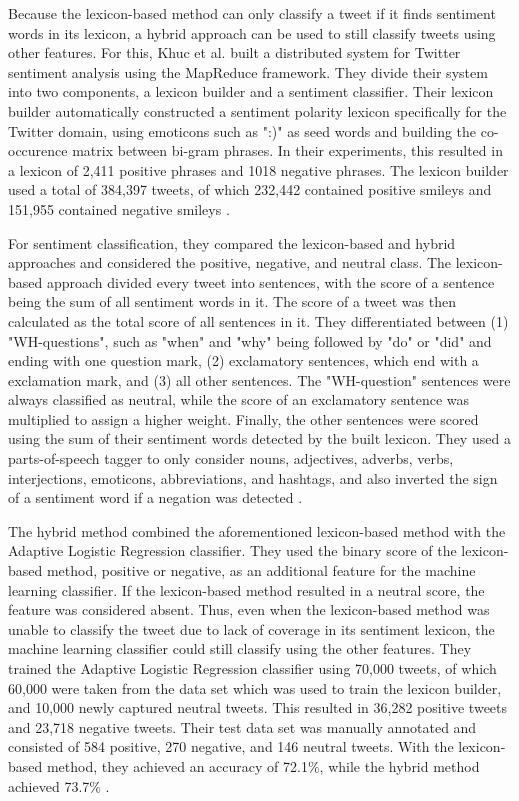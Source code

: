 Because the lexicon-based method can only classify a tweet if it finds sentiment words in its lexicon, a hybrid approach can be used to still classify tweets using other features. For this, Khuc et al. built a distributed system for Twitter sentiment analysis using the MapReduce framework. They divide their system into two components, a lexicon builder and a sentiment classifier. Their lexicon builder automatically constructed a sentiment polarity lexicon specifically for the Twitter domain, using emoticons such as ":)" as seed words and building the co-occurence matrix between bi-gram phrases. In their experiments, this resulted in a lexicon of 2,411 positive phrases and 1018 negative phrases. The lexicon builder used a total of 384,397 tweets, of which 232,442 contained positive smileys and 151,955 contained negative smileys \cite{khuc}.

For sentiment classification, they compared the lexicon-based and hybrid approaches and considered the positive, negative, and neutral class. The lexicon-based approach divided every tweet into sentences, with the score of a sentence being the sum of all sentiment words in it. The score of a tweet was then calculated as the total score of all sentences in it. They differentiated between (1) "WH-questions", such as "when" and "why" being followed by "do" or "did" and ending with one question mark, (2) exclamatory sentences, which end with a exclamation mark, and (3) all other sentences. The "WH-question" sentences were always classified as neutral, while the score of an exclamatory sentence was multiplied to assign a higher weight. Finally, the other sentences were scored using the sum of their sentiment words detected by the built lexicon. They used a parts-of-speech tagger to only consider nouns, adjectives, adverbs, verbs, interjections, emoticons, abbreviations, and hashtags, and also inverted the sign of a sentiment word if a negation was detected \cite{khuc}.

The hybrid method combined the aforementioned lexicon-based method with the Adaptive Logistic Regression classifier. They used the binary score of the lexicon-based method, positive or negative, as an additional feature for the machine learning classifier. If the lexicon-based method resulted in a neutral score, the feature was considered absent. Thus, even when the lexicon-based method was unable to classify the tweet due to lack of coverage in its sentiment lexicon, the machine learning classifier could still classify using the other features. They trained the Adaptive Logistic Regression classifier using 70,000 tweets, of which 60,000 were taken from the data set which was used to train the lexicon builder, and 10,000 newly captured neutral tweets. This resulted in 36,282 positive tweets and 23,718 negative tweets. Their test data set was manually annotated and consisted of 584 positive, 270 negative, and 146 neutral tweets. With the lexicon-based method, they achieved an accuracy of 72.1\%, while the hybrid method achieved 73.7\% \cite{khuc}.










